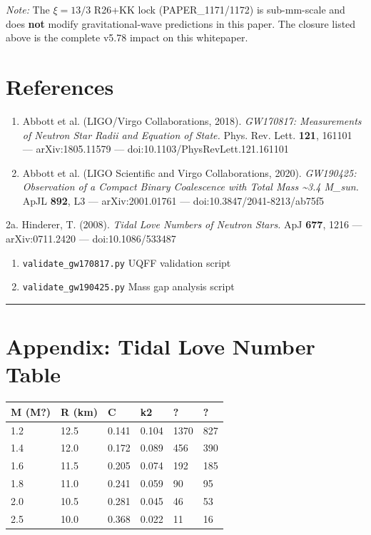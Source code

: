\documentclass[11pt]{article}
\begin{document}
\emph{Note:} The $\xi=13/3$ R26+KK lock (PAPER\_1171/1172) is sub-mm-scale and does \textbf{not} modify gravitational-wave predictions in this paper. The closure listed above is the complete v5.78 impact on this whitepaper.

\section*{References}

\begin{enumerate}
  \item Abbott et al. (LIGO/Virgo Collaborations, 2018). \emph{GW170817: Measurements of Neutron Star Radii and Equation of State.} Phys. Rev. Lett. \textbf{121}, 161101 --- arXiv:1805.11579 --- doi:10.1103/PhysRevLett.121.161101
  \item Abbott et al. (LIGO Scientific and Virgo Collaborations, 2020). \emph{GW190425: Observation of a Compact Binary Coalescence with Total Mass \textasciitilde{}3.4 M\_sun.} ApJL \textbf{892}, L3 --- arXiv:2001.01761 --- doi:10.3847/2041-8213/ab75f5
\end{enumerate}

2a. Hinderer, T. (2008). \emph{Tidal Love Numbers of Neutron Stars.} ApJ \textbf{677}, 1216 --- arXiv:0711.2420 --- doi:10.1086/533487

\begin{enumerate}
  \item \verb|validate_gw170817.py|  UQFF validation script
  \item \verb|validate_gw190425.py|  Mass gap analysis script
\end{enumerate}

\noindent\rule{\textwidth}{0.4pt}

\section*{Appendix: Tidal Love Number Table}

\begin{center}
\begin{longtable}{llllll}
\toprule
M (M?) & R (km) & C & k2 & ? & ? \tabularnewline
\midrule
\endhead
1.2 & 12.5 & 0.141 & 0.104 & 1370 & 827 \tabularnewline
1.4 & 12.0 & 0.172 & 0.089 & 456 & 390 \tabularnewline
1.6 & 11.5 & 0.205 & 0.074 & 192 & 185 \tabularnewline
1.8 & 11.0 & 0.241 & 0.059 & 90 & 95 \tabularnewline
2.0 & 10.5 & 0.281 & 0.045 & 46 & 53 \tabularnewline
2.5 & 10.0 & 0.368 & 0.022 & 11 & 16 \tabularnewline
\bottomrule
\end{longtable}
\end{center}
\end{document}
